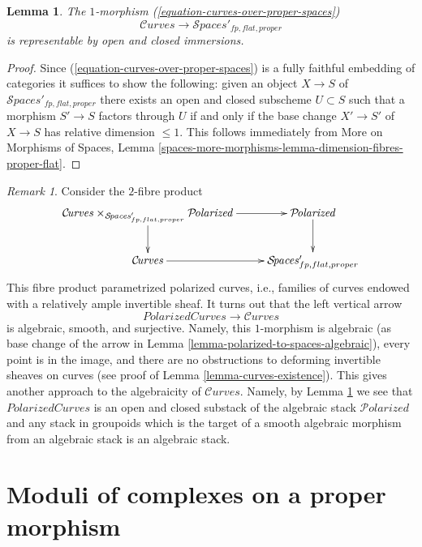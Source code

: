\documentclass{stacks-project}
\theoremstyle{plain}
\newtheorem{lemma}[subsection]{Lemma}
\theoremstyle{definition}
\theoremstyle{remark}
\newtheorem{remark}[subsection]{Remark}
\numberwithin{equation}{subsection}
\def\Spacesstack{\mathcal{S}\!\mathit{paces}}
\def\Curvesstack{\mathcal{C}\!\mathit{urves}}
\def\Polarizedstack{\mathcal{P}\!\mathit{olarized}}
\begin{document}
\begin{lemma}
\label{lemma-curves-open-and-closed-in-spaces}
The $1$-morphism (\ref{equation-curves-over-proper-spaces})
$$
\Curvesstack \longrightarrow \Spacesstack'_{fp, flat, proper}
$$
is representable by open and closed immersions.
\end{lemma}

\begin{proof}
Since (\ref{equation-curves-over-proper-spaces}) is a fully faithful
embedding of categories it suffices to show the following:
given an object $X \to S$ of $\Spacesstack'_{fp, flat, proper}$
there exists an open and closed subscheme $U \subset S$
such that a morphism $S' \to S$ factors through $U$ if and only if the
base change $X' \to S'$ of $X \to S$ has relative dimension $\leq 1$.
This follows immediately from
More on Morphisms of Spaces, Lemma
\ref{spaces-more-morphisms-lemma-dimension-fibres-proper-flat}.
\end{proof}

\begin{remark}
\label{remark-alternative-approach-curves}
Consider the $2$-fibre product
$$
\xymatrix{
\Curvesstack \times_{\Spacesstack'_{fp, flat, proper}}
\Polarizedstack \ar[r] \ar[d] &
\Polarizedstack \ar[d] \\
\Curvesstack \ar[r] &
\Spacesstack'_{fp, flat, proper}
}
$$
This fibre product parametrized polarized curves, i.e., families
of curves endowed with a relatively ample invertible sheaf.
It turns out that the left vertical arrow
$$
\textit{PolarizedCurves} \longrightarrow \Curvesstack
$$
is algebraic, smooth, and surjective. Namely, this $1$-morphism
is algebraic (as base change of the arrow in
Lemma \ref{lemma-polarized-to-spaces-algebraic}),
every point is in the image, and
there are no obstructions to deforming invertible sheaves on curves
(see proof of Lemma \ref{lemma-curves-existence}).
This gives another approach to the algebraicity of $\Curvesstack$.
Namely, by Lemma \ref{lemma-curves-open-and-closed-in-spaces}
we see that $\textit{PolarizedCurves}$ is an open and closed substack
of the algebraic stack $\Polarizedstack$ and any stack in groupoids
which is the target of a smooth algebraic morphism from an algebraic
stack is an algebraic stack.
\end{remark}









\section{Moduli of complexes on a proper morphism}
\label{section-moduli-complexes}
\end{document}

